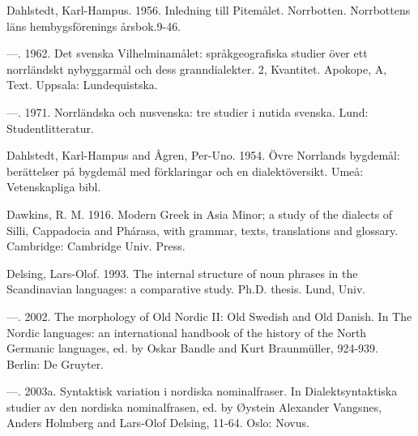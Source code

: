 \begin{styleBodytextC}
Dahlstedt, Karl-Hampus. 1956. Inledning till Pitemålet. Norrbotten. Norrbottens läns hembygsförenings årsbok.9-46.

\end{styleBodytextC}

\begin{styleBodytextC}
—. 1962. Det svenska Vilhelminamålet: språkgeografiska studier över ett norrländskt nybyggarmål och dess granndialekter. 2, Kvantitet. Apokope, A, Text. Uppsala: Lundequistska.

\end{styleBodytextC}

\begin{styleBodytextC}
—. 1971. Norrländska och nusvenska: tre studier i nutida svenska. Lund: Studentlitteratur.

\end{styleBodytextC}

\begin{styleBodytextC}
Dahlstedt, Karl-Hampus and Ågren, Per-Uno. 1954. Övre Norrlands bygdemål: berättelser på bygdemål med förklaringar och en dialektöversikt. Umeå: Vetenskapliga bibl.

\end{styleBodytextC}

\begin{styleBodytextC}
Dawkins, R. M. 1916. Modern Greek in Asia Minor; a study of the dialects of Silli, Cappadocia and Phárasa, with grammar, texts, translations and glossary. Cambridge: Cambridge Univ. Press.

\end{styleBodytextC}

\begin{styleBodytextC}
Delsing, Lars-Olof. 1993. The internal structure of noun phrases in the Scandinavian languages: a comparative study. Ph.D. thesis. Lund, Univ.

\end{styleBodytextC}

\begin{styleBodytextC}
—. 2002. The morphology of Old Nordic II: Old Swedish and Old Danish. In The Nordic languages: an international handbook of the history of the North Germanic languages, ed. by Oskar Bandle and Kurt Braunmüller, 924-939. Berlin: De Gruyter.

\end{styleBodytextC}

\begin{styleBodytextC}
—. 2003a. Syntaktisk variation i nordiska nominalfraser. In Dialektsyntaktiska studier av den nordiska nominalfrasen, ed. by Øystein Alexander Vangsnes, Anders Holmberg and Lars-Olof Delsing, 11-64. Oslo: Novus.

\end{styleBodytextC}

